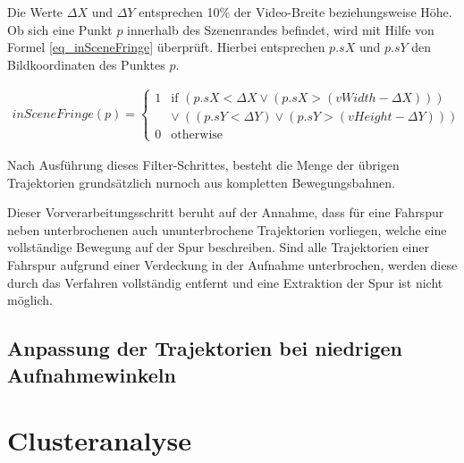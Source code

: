 Die Werte $\Delta X$ und $\Delta Y$ entsprechen 10\% der Video-Breite beziehungsweise Höhe.
Ob sich eine Punkt $p$ innerhalb des Szenenrandes befindet, wird mit Hilfe von Formel \ref{eq_inSceneFringe} überprüft.
Hierbei entsprechen $p.sX$ und $p.sY$ den Bildkoordinaten des Punktes $p$.

\begin{ceqn}
\begin{align}
\label{eq_inSceneFringe}
    inSceneFringe(p) =
    \begin{cases}
        1 & \text{if } (p.sX < \Delta X \lor (p.sX > (vWidth - \Delta X))) \\
          &            \lor\ ((p.sY < \Delta Y) \lor (p.sY > (vHeight - \Delta Y))) \\
        0 & \text{otherwise}
    \end{cases}
\end{align}
\end{ceqn}

Nach Ausführung dieses Filter-Schrittes, besteht die Menge der übrigen Trajektorien grundsätzlich nurnoch
aus kompletten Bewegungsbahnen.

Dieser Vorverarbeitungsschritt beruht auf der Annahme, dass für eine Fahrspur neben unterbrochenen auch
ununterbrochene Trajektorien vorliegen, welche eine vollständige Bewegung auf der Spur beschreiben.
Sind alle Trajektorien einer Fahrspur aufgrund einer Verdeckung in der Aufnahme unterbrochen, werden
diese durch das Verfahren vollständig entfernt und eine Extraktion der Spur ist nicht möglich.

\subsection{Anpassung der Trajektorien bei niedrigen Aufnahmewinkeln}



\section{Clusteranalyse}
\label{sec:realisation_clustering}


